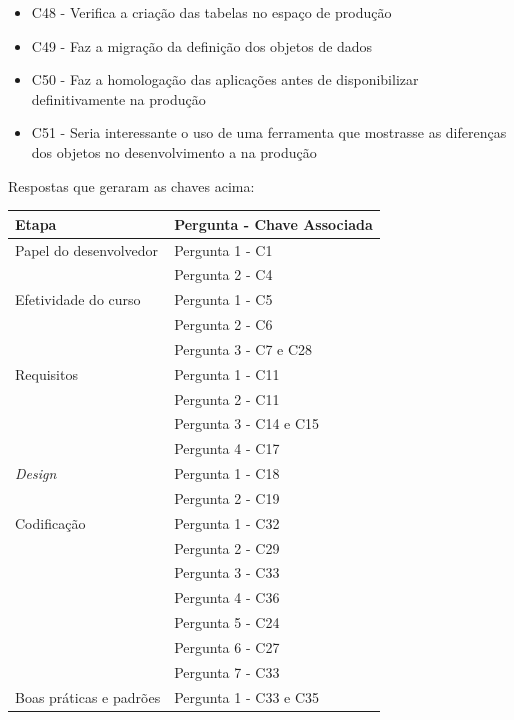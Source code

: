 \begin{itemize}
\item C48 - Verifica a criação das tabelas no espaço de produção
\item C49 - Faz a migração da definição dos objetos de dados
\item C50 - Faz a homologação das aplicações antes de disponibilizar definitivamente na produção
\item C51 - Seria interessante o uso de uma ferramenta que mostrasse as diferenças dos objetos no desenvolvimento a na produção\newline\newline
\end{itemize} Respostas que geraram as chaves acima:\newline

\begin{table}[h]
	\centering
	\begin{tabular}{|m{4.8cm} | m{4.8cm} |}
		\hline
		\textbf{Etapa} & \textbf{Pergunta - Chave Associada} \\ \hline
		Papel do desenvolvedor & Pergunta 1 - C1 \\ \cline{2-2}
		& Pergunta 2 - C4 \\ \cline{2-2}
		\hline
		Efetividade do curso & Pergunta 1 - C5 \\ \cline{2-2}
		& Pergunta 2 - C6 \\ \cline{2-2}
		& Pergunta 3 - C7 e C28 \\ \cline{2-2}
		\hline
		Requisitos & Pergunta 1 - C11 \\ \cline{2-2}
		 & Pergunta 2 - C11 \\ \cline{2-2}
		& Pergunta 3 - C14 e C15 \\ \cline{2-2}
		& Pergunta 4 - C17 \\ \cline{2-2}
		 \hline
		\textit{Design} & Pergunta 1 - C18 \\ \cline{2-2}
		& Pergunta 2 - C19 \\ \cline{2-2}
		 \hline
		Codificação & Pergunta 1 - C32 \\ \cline{2-2}
		& Pergunta 2 - C29 \\ \cline{2-2}
		& Pergunta 3 - C33 \\ \cline{2-2}
		& Pergunta 4 - C36 \\ \cline{2-2}
		& Pergunta 5 - C24 \\ \cline{2-2}
		& Pergunta 6 - C27 \\ \cline{2-2}
		& Pergunta 7 - C33 \\ \cline{2-2} \hline
		Boas práticas e padrões & Pergunta 1 - C33 e C35 \\ \cline{2-2}

\end{tabular}
\end{table}
